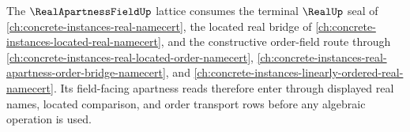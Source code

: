 The $\RealApartnessFieldUp$ lattice consumes the terminal $\RealUp$ seal of \autoref{ch:concrete-instances-real-namecert}, the located real bridge of \autoref{ch:concrete-instances-located-real-namecert}, and the constructive order-field route through \autoref{ch:concrete-instances-real-located-order-namecert}, \autoref{ch:concrete-instances-real-apartness-order-bridge-namecert}, and \autoref{ch:concrete-instances-linearly-ordered-real-namecert}. Its field-facing apartness reads therefore enter through displayed real names, located comparison, and order transport rows before any algebraic operation is used.
